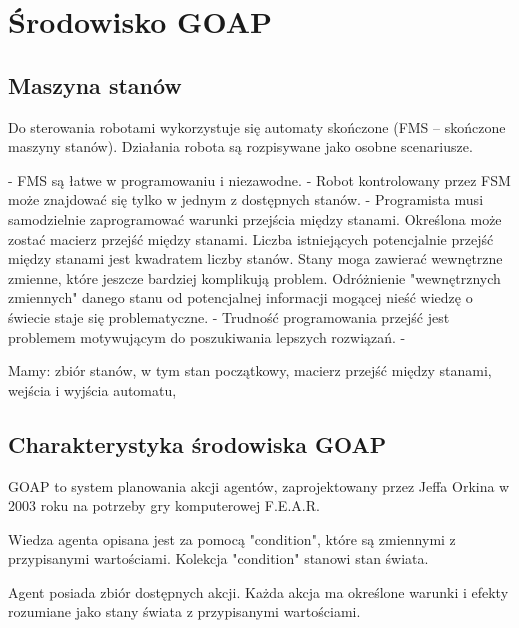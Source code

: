 \chapter{Środowisko GOAP}

\section{Maszyna stanów}

Do sterowania robotami wykorzystuje się automaty skończone (FMS – skończone maszyny stanów). Działania robota są rozpisywane jako osobne scenariusze. 

- FMS są łatwe w programowaniu i niezawodne.
- Robot kontrolowany przez FSM może znajdować się tylko w jednym z dostępnych stanów.
- Programista musi samodzielnie zaprogramować warunki przejścia między stanami. Określona może zostać macierz przejść między stanami. Liczba istniejących potencjalnie przejść między stanami jest kwadratem liczby stanów. Stany moga zawierać wewnętrzne zmienne, które jeszcze bardziej komplikują problem. Odróżnienie "wewnętrznych zmiennych" danego stanu od potencjalnej informacji mogącej nieść wiedzę o świecie staje się problematyczne.
- Trudność programowania przejść jest problemem motywującym do poszukiwania lepszych rozwiązań.
- 

Mamy: zbiór stanów, w tym stan początkowy, macierz przejść między stanami, wejścia i wyjścia automatu,

\section{Charakterystyka środowiska GOAP}


GOAP to system planowania akcji agentów, zaprojektowany przez Jeffa Orkina w 2003 roku na potrzeby gry komputerowej F.E.A.R.

Wiedza agenta opisana jest za pomocą "condition", które są zmiennymi z przypisanymi wartościami. Kolekcja "condition" stanowi stan świata. %

Agent posiada zbiór dostępnych akcji. Każda akcja ma określone warunki i efekty rozumiane jako stany świata z przypisanymi wartościami. 



